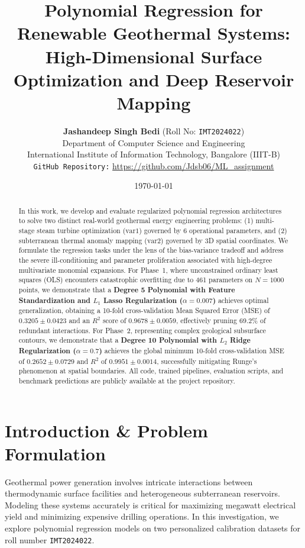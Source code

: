 \documentclass[10pt,twocolumn]{article}
\title{\textbf{\Large Polynomial Regression for Renewable Geothermal Systems: \\ High-Dimensional Surface Optimization and Deep Reservoir Mapping}}
\author{\textbf{Jashandeep Singh Bedi} \quad (Roll No: \texttt{IMT2024022}) \\
Department of Computer Science and Engineering \\
International Institute of Information Technology, Bangalore (IIIT-B) \\
\texttt{GitHub Repository:} \url{https://github.com/Jdsb06/ML_assignment}}
\date{\today}
\begin{document}
\maketitle

\begin{abstract}
\noindent In this work, we develop and evaluate regularized polynomial regression architectures to solve two distinct real-world geothermal energy engineering problems: (1) multi-stage steam turbine optimization ($\text{var1}$) governed by 6 operational parameters, and (2) subterranean thermal anomaly mapping ($\text{var2}$) governed by 3D spatial coordinates. We formulate the regression tasks under the lens of the bias-variance tradeoff and address the severe ill-conditioning and parameter proliferation associated with high-degree multivariate monomial expansions. For Phase~1, where unconstrained ordinary least squares (OLS) encounters catastrophic overfitting due to 461 parameters on $N=1000$ points, we demonstrate that a \textbf{Degree 5 Polynomial with Feature Standardization and $L_1$ Lasso Regularization ($\alpha = 0.007$)} achieves optimal generalization, obtaining a 10-fold cross-validation Mean Squared Error (MSE) of $\mathbf{0.3205 \pm 0.0423}$ and an $R^2$ score of $\mathbf{0.9678 \pm 0.0059}$, effectively pruning 69.2\% of redundant interactions. For Phase~2, representing complex geological subsurface contours, we demonstrate that a \textbf{Degree 10 Polynomial with $L_2$ Ridge Regularization ($\alpha = 0.7$)} achieves the global minimum 10-fold cross-validation MSE of $\mathbf{0.2652 \pm 0.0729}$ and $R^2$ of $\mathbf{0.9951 \pm 0.0014}$, successfully mitigating Runge's phenomenon at spatial boundaries. All code, trained pipelines, evaluation scripts, and benchmark predictions are publicly available at the project repository.
\end{abstract}

\section{Introduction \& Problem Formulation}
Geothermal power generation involves intricate interactions between thermodynamic surface facilities and heterogeneous subterranean reservoirs. Modeling these systems accurately is critical for maximizing megawatt electrical yield and minimizing expensive drilling operations. In this investigation, we explore polynomial regression models on two personalized calibration datasets for roll number \texttt{IMT2024022}.
\end{document}
